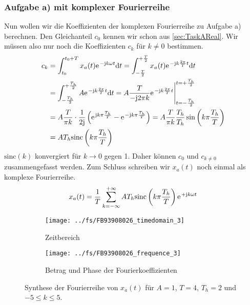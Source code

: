 \documentclass[11pt,a4paper,DIV=12]{scrartcl}
\newcommand{\sinc}{\mathrm{sinc}}
\begin{document}
\subsubsection{Aufgabe a) mit komplexer Fourierreihe}
Nun wollen wir die Koeffizienten der komplexen Fourierreihe zu Aufgabe a)
berechnen. Den Gleichanteil $c_0$ kennen wir schon aus \ref{sec:TaskAReal}.
%
Wir müssen also nur noch die Koeffizienten $c_k$ für $k\neq 0$ bestimmen.
%
\begin{align}
	c_k&=\int_{t_0}^{t_0+T}x_{a}(t)\e^{-\im k \omega t}\diff t
	=\int_{-\frac{T}{2}}^{+\frac{T}{2}}x_a(t)\e^{-\im k \frac{2\pi}{T}t}\diff t\nonumber\\
	&=\int_{-\frac{T_h}{2}}^{+\frac{T_h}{2}}A\e^{-\im k \frac{2\pi}{T}t}\diff t
	=A\frac{T}{-\im 2\pi k}\e^{-\im k \frac{2\pi}{T}t}\Bigg |_{t=-\frac{T_h}{2}}^{t=+\frac{T_h}{2}}\nonumber\\
	&=A\frac{T}{\pi k}\cdot\frac{1}{2\im}\left (\e^{\im k \pi \frac{T_h}{T}}-\e^{-\im k \pi \frac{T_h}{T}}\right )
	=A\frac{T}{\pi k}\frac{T_h}{T_h}\sin\left(k\pi\frac{T_h}{T}\right)\nonumber\\
	&=AT_h\sinc\left(k\pi\frac{T_h}{T}\right)
\end{align}
%
$\sinc(k)$ konvergiert für $k\rightarrow0$ gegen 1.
%
Daher können $c_0$ und $c_{k\neq0}$ zusammengefasst werden.
%
Zum Schluss schreiben wir $x_{a}(t)$ noch einmal als komplexe Fourierreihe.
%
\begin{align}
	x_{a}(t)=\frac{1}{T}\sum_{k=-\infty}^{+\infty}AT_h\sinc\left(k\pi\frac{T_h}{T}\right)\e^{+\im k \omega t}
\end{align}
%

%
\begin{figure}
	\centering
	\begin{subfigure}{\textwidth}
		\texttt{[image: ../fs/FB93908026\_timedomain\_3]}
		\caption{Zeitbereich}
	\end{subfigure}
	\begin{subfigure}{\textwidth}
		\texttt{[image: ../fs/FB93908026\_frequence\_3]}
		\caption{Betrag und Phase der Fourierkoeffizienten}
	\end{subfigure}
	\caption{Synthese der Fourierreihe von $x_a(t)$ für $A=1$, $T=4$, $T_h=2$ und
		$-5\leq k\leq5$.}
\end{figure}
\newpage
\end{document}
